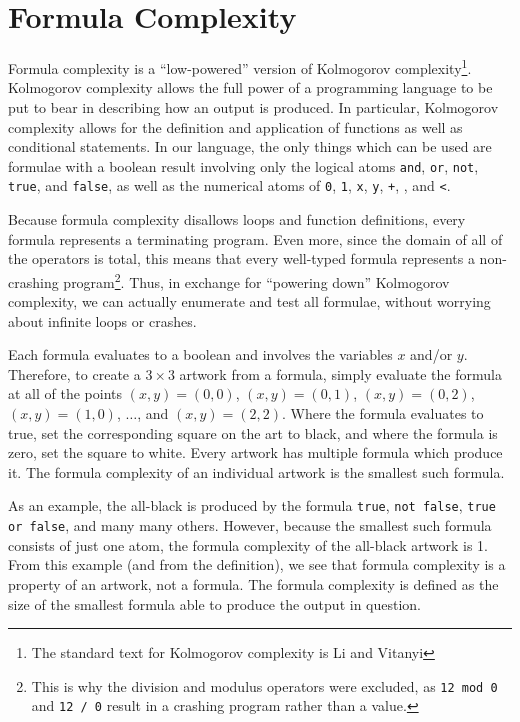 
\section{Formula Complexity}
\label{sec:formula}

Formula complexity is a ``low-powered'' version of Kolmogorov complexity\footnote{The standard text for Kolmogorov complexity is Li and Vitanyi\cite{Li}}.  Kolmogorov complexity
allows the full power of a programming language to be put to bear in describing
how an output is produced.  In particular, Kolmogorov complexity allows for the definition and
application of functions as well as conditional statements.  In our language,
the only things which can be used are formulae with a boolean result
involving only the logical atoms {\tt and}, {\tt or}, {\tt not}, {\tt true},
and {\tt false}, as well as the numerical atoms of {\tt 0}, {\tt 1}, {\tt x},
{\tt y}, {\tt +}, {\tt *}, and {\tt <}.

Because formula complexity disallows loops and function definitions, every
formula represents a terminating program.  Even more, since the domain of all
of the operators is total, this means that every well-typed formula represents
a non-crashing program\footnote{This is why the division and modulus operators
were excluded, as {\tt 12 mod 0} and {\tt 12 / 0} result in a crashing program
rather than a value.}.  Thus, in exchange for ``powering down'' Kolmogorov complexity, we can
actually enumerate and test all formulae, without worrying about infinite loops
or crashes.

Each formula evaluates to a boolean and involves the variables $x$ and/or $y$.
Therefore, to create a $3\times3$ artwork from a formula, simply evaluate the formula
at all of the points $(x,y) = (0,0)$, $(x,y) = (0,1)$, $(x,y) = (0,2)$, $(x,y)
= (1,0)$, $\ldots$, and $(x,y) = (2,2)$.  Where the formula evaluates to true,
set the corresponding square on the art to black, and where the formula is
zero, set the square to white.  Every artwork has multiple formula which
produce it.  The formula complexity of an individual artwork is the smallest
such formula.

As an example, the all-black is produced by the formula {\tt true}, {\tt not
false}, {\tt true or false}, and many many others.  However, because the
smallest such formula consists of just one atom, the formula complexity of the
all-black artwork is 1.  From this example (and from the definition), we see
that formula complexity is a property of an artwork, not a formula.  The
formula complexity is defined as the size of the smallest formula able to
produce the output in question. 

